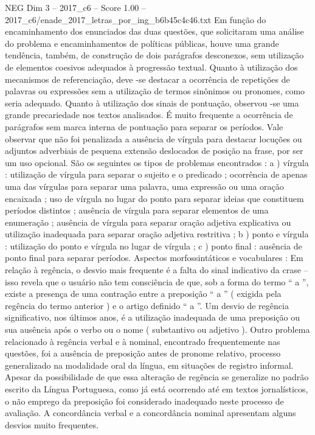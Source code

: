 \begin{textsample}{NEG Dim 3 – 2017\_c6 – Score 1.00 – 2017\_c6/enade\_2017\_letras\_por\_ing\_b6b45c4c46.txt}
Em função do encaminhamento dos enunciados das duas questões, que solicitaram uma análise do problema e encaminhamentos de políticas públicas, houve uma grande tendência, também, de construção de dois parágrafos desconexos, sem utilização de elementos coesivos adequados à progressão textual.
Quanto à utilização dos mecanismos de referenciação, deve -se destacar a ocorrência de repetições de palavras ou expressões sem a utilização de termos sinônimos ou pronomes, como seria adequado.
Quanto à utilização dos sinais de pontuação, observou -se uma grande precariedade nos textos analisados.
É muito frequente a ocorrência de parágrafos sem marca interna de pontuação para separar os períodos.
Vale observar que não foi penalizada a ausência de vírgula para destacar locuções ou adjuntos adverbiais de pequena extensão deslocados de posição na frase, por ser um uso opcional.
São os seguintes os tipos de problemas encontrados : a ) vírgula : utilização de vírgula para separar o sujeito e o predicado ; ocorrência de apenas uma das vírgulas para separar uma palavra, uma expressão ou uma oração encaixada ; uso de vírgula no lugar do ponto para separar ideias que constituem períodos distintos ; ausência de vírgula para separar elementos de uma enumeração ; ausência de vírgula para separar oração adjetiva explicativa ou utilização inadequada para separar oração adjetiva restritiva ; b ) ponto e vírgula : utilização do ponto e vírgula no lugar de vírgula ; c ) ponto final : ausência de ponto final para separar períodos.
Aspectos morfossintáticos e vocabulares : Em relação à regência, o desvio mais frequente é a falta do sinal indicativo da crase – isso revela que o usuário não tem consciência de que, sob a forma do termo “ a ”, existe a presença de uma contração entre a preposição “ a ” ( exigida pela regência do termo anterior ) e o artigo definido “ a ”.
Um desvio de regência significativo, nos últimos anos, é a utilização inadequada de uma preposição ou sua ausência após o verbo ou o nome ( substantivo ou adjetivo ).
Outro problema relacionado à regência verbal e à nominal, encontrado frequentemente nas questões, foi a ausência de preposição antes de pronome relativo, processo generalizado na modalidade oral da língua, em situações de registro informal.
Apesar da possibilidade de que essa alteração de regência se generalize no padrão escrito da Língua Portuguesa, como já está ocorrendo até em textos jornalísticos, o não emprego da preposição foi considerado inadequado neste processo de avaliação.
A concordância verbal e a concordância nominal apresentam alguns desvios muito frequentes.

\end{textsample}
